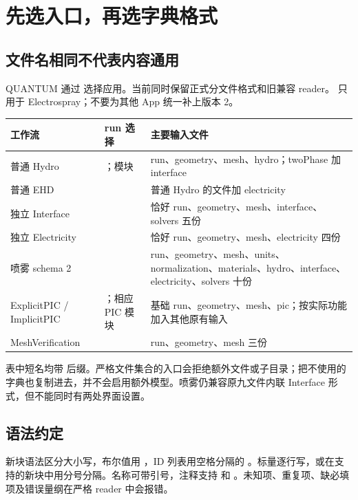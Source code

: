 \documentclass[a4paper,11pt]{article}
\begin{document}

\section{先选入口，再选字典格式}
\subsection{文件名相同不代表内容通用}
QUANTUM 通过  选择应用。当前同时保留正式分文件格式和旧兼容 reader。 只用于 Electrospray；不要为其他 App 统一补上版本 2。

\begin{longtable}{L{.24\linewidth}L{.30\linewidth}L{.38\linewidth}}
\toprule 工作流 & run 选择 & 主要输入文件 \\\midrule\endhead
普通 Hydro & ；模块  & run、geometry、mesh、hydro；twoPhase 加 interface \\
普通 EHD &  & 普通 Hydro 的文件加 electricity \\
独立 Interface &  & 恰好 run、geometry、mesh、interface、solvers 五份 \\
独立 Electricity &  & 恰好 run、geometry、mesh、electricity 四份 \\
喷雾 schema 2 &  & run、geometry、mesh、units、normalization、materials、hydro、interface、electricity、solvers 十份 \\
ExplicitPIC / ImplicitPIC & ；相应 PIC 模块 & 基础 run、geometry、mesh、pic；按实际功能加入其他原有输入 \\
MeshVerification &  & run、geometry、mesh 三份 \\
\bottomrule
\end{longtable}
表中短名均带  后缀。严格文件集合的入口会拒绝额外文件或子目录；把不使用的字典也复制进去，并不会启用额外模型。喷雾仍兼容原九文件内联 Interface 形式，但不能同时有两处界面设置。

\subsection{语法约定}
新块语法区分大小写，布尔值用 ，ID 列表用空格分隔的 。标量逐行写，或在支持的新块中用分号分隔。名称可带引号，注释支持 \code{\#} 和 \code{//}。未知项、重复项、缺必填项及错误量纲在严格 reader 中会报错。
\end{document}
